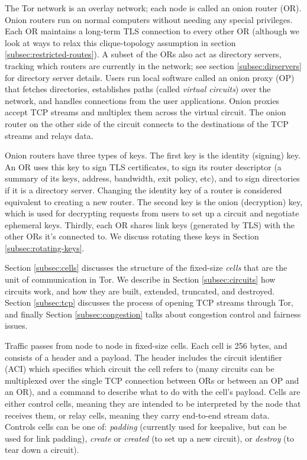 \documentclass[times,10pt,twocolumn]{article}
\begin{document}
The Tor network is an overlay network; each node is called an onion router
(OR). Onion routers run on normal computers without needing any special
privileges. Each OR maintains a long-term TLS connection to every other
OR (although we look at ways to relax this clique-topology assumption in
section \ref{subsec:restricted-routes}). A subset of the ORs also act as
directory servers, tracking which routers are currently in the network;
see section \ref{subsec:dirservers} for directory server details. Users
run local software called an onion proxy (OP) that fetches directories,
establishes paths (called \emph{virtual circuits}) over the network,
and handles connections from the user applications. Onion proxies accept
TCP streams and multiplex them across the virtual circuit. The onion
router on the other side of the circuit connects to the destinations of
the TCP streams and relays data.

Onion routers have three types of keys. The first key is the identity
(signing) key. An OR uses this key to sign TLS certificates, to sign its
router descriptor (a summary of its keys, address, bandwidth, exit policy,
etc), and to sign directories if it is a directory server. Changing the
identity key of a router is considered equivalent to creating a new
router. The second key is the onion (decryption) key, which is used
for decrypting requests from users to set up a circuit and negotiate
ephemeral keys. Thirdly, each OR shares link keys (generated by TLS)
with the other ORs it's connected to. We discuss rotating these keys in
Section \ref{subsec:rotating-keys}.

Section \ref{subsec:cells} discusses the structure of the fixed-size
\emph{cells} that are the unit of communication in Tor. We describe
in Section \ref{subsec:circuits} how circuits work, and how they are
built, extended, truncated, and destroyed. Section \ref{subsec:tcp}
discusses the process of opening TCP streams through Tor, and finally
Section \ref{subsec:congestion} talks about congestion control and
fairness issues.

\label{subsec:cells}

Traffic passes from node to node in fixed-size cells. Each cell is 256
bytes, and consists of a header and a payload. The header includes the
circuit identifier (ACI) which specifies which circuit the cell refers to
(many circuits can be multiplexed over the single TCP connection between
ORs or between an OP and an OR), and a command to describe what to do
with the cell's payload. Cells are either control cells, meaning they are
intended to be interpreted by the node that receives them, or relay cells,
meaning they carry end-to-end stream data. Controls cells can be one of:
\emph{padding} (currently used for keepalive, but can be used for link
padding), \emph{create} or \emph{created} (to set up a new circuit),
or \emph{destroy} (to tear down a circuit).
\end{document}
